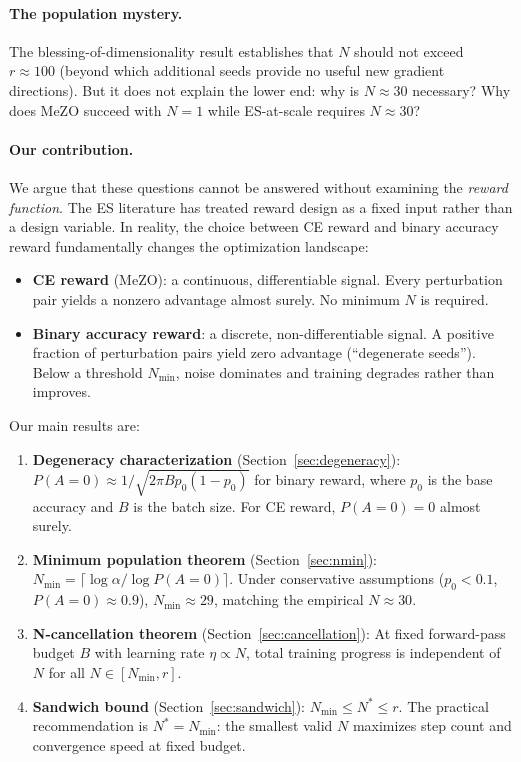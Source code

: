 \documentclass[11pt]{article}
\theoremstyle{definition}
\theoremstyle{remark}
\newcommand{\Nmin}{N_{\mathrm{min}}}
\begin{document}
\paragraph{The population mystery.}
The blessing-of-dimensionality result establishes that $N$ should not exceed $r \approx 100$ (beyond which additional seeds provide no useful new gradient directions). But it does not explain the lower end: why is $N \approx 30$ necessary? Why does MeZO succeed with $N=1$ while ES-at-scale requires $N \approx 30$?

\paragraph{Our contribution.}
We argue that these questions cannot be answered without examining the \emph{reward function}. The ES literature has treated reward design as a fixed input rather than a design variable. In reality, the choice between CE reward and binary accuracy reward fundamentally changes the optimization landscape:
\begin{itemize}[leftmargin=*]
  \item \textbf{CE reward} (MeZO): a continuous, differentiable signal. Every perturbation pair yields a nonzero advantage almost surely. No minimum $N$ is required.
  \item \textbf{Binary accuracy reward}: a discrete, non-differentiable signal. A positive fraction of perturbation pairs yield zero advantage (``degenerate seeds''). Below a threshold $\Nmin$, noise dominates and training degrades rather than improves.
\end{itemize}

Our main results are:
\begin{enumerate}[leftmargin=*]
  \item \textbf{Degeneracy characterization} (Section~\ref{sec:degeneracy}): $P(A=0) \approx 1/\sqrt{2\pi B p_0(1-p_0)}$ for binary reward, where $p_0$ is the base accuracy and $B$ is the batch size. For CE reward, $P(A=0) = 0$ almost surely.
  \item \textbf{Minimum population theorem} (Section~\ref{sec:nmin}): $\Nmin = \lceil \log\alpha / \log P(A=0) \rceil$. Under conservative assumptions ($p_0 < 0.1$, $P(A=0) \approx 0.9$), $\Nmin \approx 29$, matching the empirical $N \approx 30$.
  \item \textbf{N-cancellation theorem} (Section~\ref{sec:cancellation}): At fixed forward-pass budget $B$ with learning rate $\eta \propto N$, total training progress is independent of $N$ for all $N \in [\Nmin, r]$.
  \item \textbf{Sandwich bound} (Section~\ref{sec:sandwich}): $\Nmin \leq N^* \leq r$. The practical recommendation is $N^* = \Nmin$: the smallest valid $N$ maximizes step count and convergence speed at fixed budget.
\end{enumerate}
\end{document}
